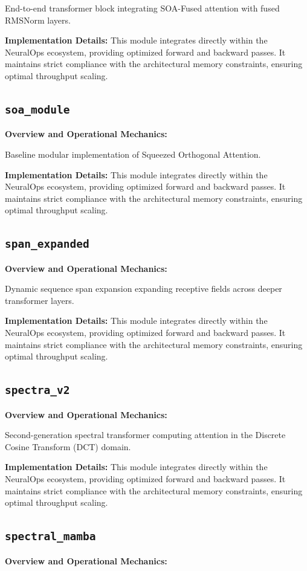 \documentclass[10pt,twocolumn,letterpaper]{article}
\begin{document}
End-to-end transformer block integrating SOA-Fused attention with fused RMSNorm layers.

\textbf{Implementation Details:}
This module integrates directly within the NeuralOps ecosystem, providing optimized forward and backward passes. It maintains strict compliance with the architectural memory constraints, ensuring optimal throughput scaling.

\subsection{\texttt{soa\_module}}
\textbf{Overview and Operational Mechanics:}

Baseline modular implementation of Squeezed Orthogonal Attention.

\textbf{Implementation Details:}
This module integrates directly within the NeuralOps ecosystem, providing optimized forward and backward passes. It maintains strict compliance with the architectural memory constraints, ensuring optimal throughput scaling.

\subsection{\texttt{span\_expanded}}
\textbf{Overview and Operational Mechanics:}

Dynamic sequence span expansion expanding receptive fields across deeper transformer layers.

\textbf{Implementation Details:}
This module integrates directly within the NeuralOps ecosystem, providing optimized forward and backward passes. It maintains strict compliance with the architectural memory constraints, ensuring optimal throughput scaling.

\subsection{\texttt{spectra\_v2}}
\textbf{Overview and Operational Mechanics:}

Second-generation spectral transformer computing attention in the Discrete Cosine Transform (DCT) domain.

\textbf{Implementation Details:}
This module integrates directly within the NeuralOps ecosystem, providing optimized forward and backward passes. It maintains strict compliance with the architectural memory constraints, ensuring optimal throughput scaling.

\subsection{\texttt{spectral\_mamba}}
\textbf{Overview and Operational Mechanics:}
\end{document}
